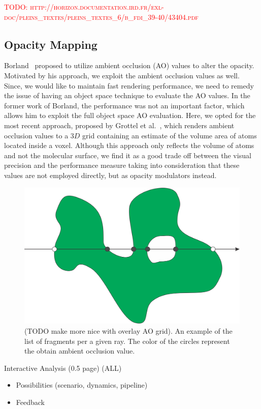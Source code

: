 \textcolor{red}{TODO: \textsc{http://horizon.documentation.ird.fr/exl-doc/pleins\_textes/pleins\_textes\_6/b\_fdi\_39-40/43404.pdf}}

\subsection{Opacity Mapping}
Borland~\cite{borland2011ambient} proposed to utilize ambient occlusion (AO) values to alter the opacity. Motivated by his approach, we exploit the ambient occlusion values as well. Since, we would like to maintain fast rendering performance, we need to remedy the issue of having an object space technique to evaluate the AO values. In the former work of Borland, the performance was not an important factor, which allows him to exploit the full object space AO evaluation. Here, we opted for the most recent approach, proposed by Grottel et al.~\cite{grottel}, which renders ambient occlusion values to a $3D$ grid containing an estimate of the volume area of atoms located inside a voxel. Although this approach only reflects the volume of atoms and not the molecular surface, we find it as a good trade off between the visual precision and the performance measure taking into consideration that these values are not employed directly, but as opacity modulators instead.
	
\begin{figure}[htb]
\centering
  \includegraphics[width=0.8\columnwidth]{image/ray_fragments.png}
  \caption{(TODO make more nice with overlay AO grid). An example of the list of fragments per a given ray. The color of the circles represent the obtain ambient occlusion value.}
	\label{fig:ray_fragments}
\end{figure}


Interactive Analysis (0.5 page) (ALL)
\begin{itemize}
  \item Possibilities (scenario, dynamics, pipeline)
  \item Feedback
\end{itemize}


